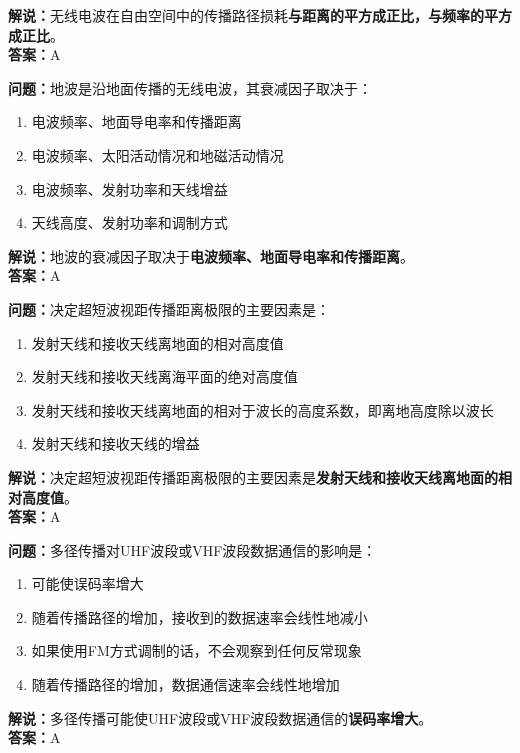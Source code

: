 \textbf{解说：}无线电波在自由空间中的传播路径损耗\textbf{与距离的平方成正比，与频率的平方成正比}。\\\textbf{答案：}A%



\textbf{问题：}地波是沿地面传播的无线电波，其衰减因子取决于：

\begin{enumerate}[label=\Alph*), leftmargin=1cm]
	\item 电波频率、地面导电率和传播距离
	\item 电波频率、太阳活动情况和地磁活动情况
	\item 电波频率、发射功率和天线增益
	\item 天线高度、发射功率和调制方式
\end{enumerate}

\textbf{解说：}地波的衰减因子取决于\textbf{电波频率、地面导电率和传播距离}。\\\textbf{答案：}A%



\textbf{问题：}决定超短波视距传播距离极限的主要因素是：

\begin{enumerate}[label=\Alph*), leftmargin=1cm]
	\item 发射天线和接收天线离地面的相对高度值
	\item 发射天线和接收天线离海平面的绝对高度值
	\item 发射天线和接收天线离地面的相对于波长的高度系数，即离地高度除以波长
	\item 发射天线和接收天线的增益
\end{enumerate}

\textbf{解说：}决定超短波视距传播距离极限的主要因素是\textbf{发射天线和接收天线离地面的相对高度值}。\\\textbf{答案：}A%



\textbf{问题：}多径传播对UHF波段或VHF波段数据通信的影响是：

\begin{enumerate}[label=\Alph*), leftmargin=1cm]
	\item 可能使误码率增大
	\item 随着传播路径的增加，接收到的数据速率会线性地减小
	\item 如果使用FM方式调制的话，不会观察到任何反常现象
	\item 随着传播路径的增加，数据通信速率会线性地增加
\end{enumerate}

\textbf{解说：}多径传播可能使UHF波段或VHF波段数据通信的\textbf{误码率增大}。\\\textbf{答案：}A%



